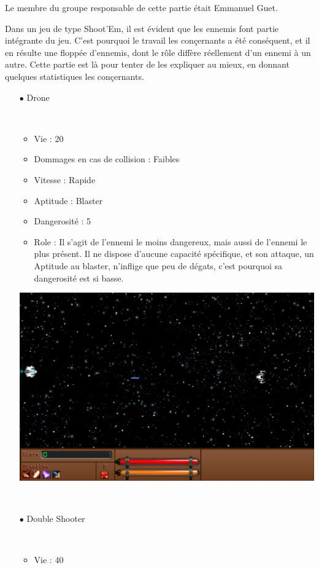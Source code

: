 \par Le membre du groupe responsable de cette partie était Emmanuel Guet.

Dans un jeu de type Shoot'Em, il est évident que les ennemis font partie intégrante du jeu.
C'est pourquoi le travail les conçernants a été conséquent, et il en résulte une floppée d'ennemis, dont le rôle diffère réellement d'un ennemi à un autre. Cette partie est là pour tenter de les expliquer au mieux, en donnant quelques statistiques les conçernants.

		\begin{itemize}
			\item[$\bullet$ Drone]
				\par~
				\begin{itemize}
					\item Vie : 20
					\item Dommages en cas de collision : Faibles
					\item Vitesse : Rapide
					\item Aptitude : Blaster
					\item Dangerosité : 5%
					\item Role : Il s'agit de l'ennemi le moins dangereux, mais aussi de l'ennemi le plus présent. Il ne dispose d'aucune capacité spécifique, et son attaque, un Aptitude au blaster, n'inflige que peu de dégats, c'est pourquoi sa dangerosité est si basse.
				\end{itemize}
\includegraphics{images/vaisseaux/drone.png}
				\par~
			\item[$\bullet$ Double Shooter]
				\par~
				\begin{itemize}
					\item Vie : 40

\end{itemize}
\end{itemize}
